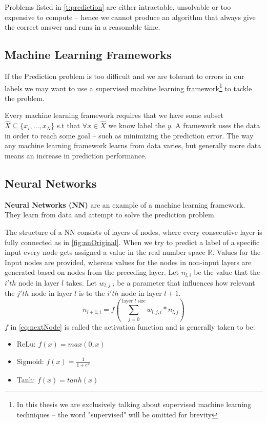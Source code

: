 \documentclass[dissertation.tex]{subfiles}
\begin{document}
Problems listed in \autoref{t:prediction} are either intractable, unsolvable or
too expensive to compute -- hence we cannot produce an algorithm that always
give the correct answer and runs in a reasonable time.

\subsection{Machine Learning Frameworks}

If the Prediction problem is too difficult and we are tolerant to errors in our
labels we may want to use a supervised machine learning framework\footnote{In
this thesis we are exclusively talking about supervised machine learning
techniques -- the word "supervised" will be omitted for brevity} to tackle the
problem. 

Every machine learning framework requires that we have some subset
$\hat{X}\subseteq\{x_i,...,x_N\}$ s.t that $ \forall x\in\hat{X}$ we know label
the $y$. A framework uses the data in order to reach some goal -- such as
minimizing the prediction error. The way any machine learning framework learns
from data varies, but generally more data means an increase in prediction
performance.

\subsection{Neural Networks} 

\textbf{Neural Networks (NN)} are an example of a machine learning framework. They learn
from data and attempt to solve the prediction problem.

The structure of a NN consists of layers of nodes, where every consecutive
layer is fully connected as in \autoref{fig:nnOriginal}.  When we try to
predict a label of a specific input every node gets assigned a value in the
real number space $\mathbb{R}$. Values for the Input nodes are provided,
whereas values for the nodes in non-input layers are generated based on nodes
from the preceding layer. Let $n_{l,i}$ be the value that the $i'th$ node in
layer $l$ takes. Let $w_{l,j,i}$ be a parameter that influences how relevant
the $j'th$ node in layer $l$ is to the $i'th$ node in layer $l+1$.
\begin{equation}
  n_{l+1,i} = f(\sum_{j = 0}^{\text{layer }l\text{ size}} w_{l,j,i}*n_{l,j})
  \label{eq:nextNode}
\end{equation}
$f$ in \autoref{eq:nextNode} is called the activation function and is generally 
taken to be:
\begin{itemize}
  \item{
      ReLu: $f(x) = max(0, x)$
    }
  \item{
      Sigmoid: $f(x) = \frac{1}{1+e^x}$
    }
  \item{
      Tanh: $f(x) = tanh(x)$
    }
\end{itemize}
\end{document}
